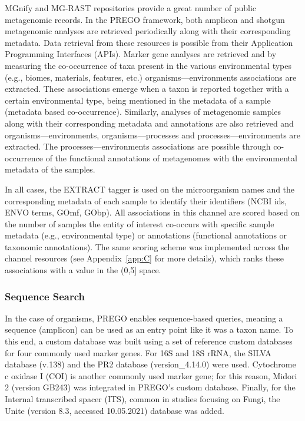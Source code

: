    MGnify \citep{mitchell2020mgnify} and MG-RAST \citep{wilke2015restful} repositories provide a great number of public metagenomic records. 
   In the PREGO framework, both amplicon and shotgun metagenomic analyses are retrieved periodically along with their corresponding metadata. 
   Data retrieval from these resources is possible from their Application Programming Interfaces (APIs). Marker gene analyses are retrieved and by measuring
   the co-occurrence of taxa present in the various environmental types (e.g., biomes, materials, features, etc.) organisms—environments associations are extracted. 
   These associations emerge when a taxon is reported together with a certain environmental type, being mentioned in the metadata of a sample (metadata based co-occurrence). 
   Similarly, analyses of metagenomic samples along with their corresponding metadata and annotations are also retrieved and organisms—environments, organisms—processes and processes—environments are extracted. 
   The processes—environments associations are possible through co-occurrence of the functional annotations of metagenomes with the environmental metadata of the samples.
   
   In all cases, the EXTRACT tagger is used on the microorganism names and the corresponding metadata of each sample to identify their identifiers (NCBI ids, ENVO terms, GOmf, GObp). 
   All associations in this channel are scored based on the number of samples the entity of interest co-occurs with specific sample metadata (e.g., environmental type) or annotations (functional annotations or taxonomic annotations). 
   The same scoring scheme was implemented across the channel resources (see Appendix~\ref{app:C} for more details), which ranks these associations with a value in the (0,5] space.


   \subsubsection*{Sequence Search}
   \label{subsec:prego-seq-search}

   In the case of organisms, PREGO enables sequence-based queries, meaning a sequence (amplicon) can be used as an entry point like it was a taxon name. 
   To this end, a custom database was built using a set of reference custom databases for four commonly used marker genes. For 16S and 18S rRNA, the SILVA database (v.138) \citep{quast2012silva} and the PR2 database (version\_4.14.0) \citep{guillou2012protist, del2018eukref} were used. 
   Cytochrome c oxidase I (COI) \citep{suter2021capturing} is another commonly used marker gene; 
   for this reason, Midori 2 (version GB243) \citep{leray2018midori} was integrated in PREGO's custom database. 
   Finally, for the Internal transcribed spacer (ITS), common in studies focusing on Fungi, the Unite (version 8.3, accessed 10.05.2021) \citep{nilsson2019unite} database was added.



